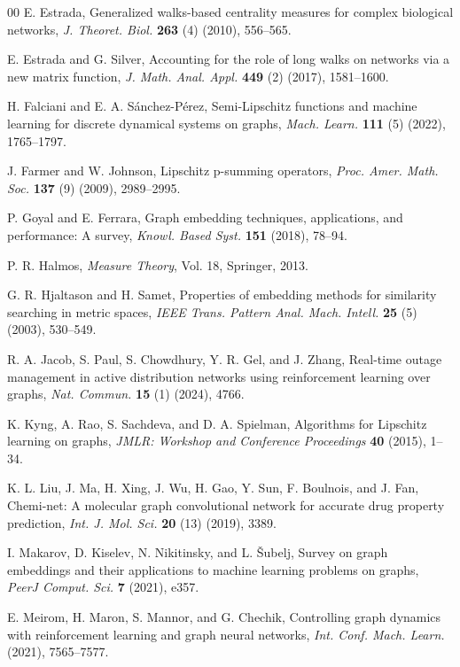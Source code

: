 \documentclass[preprint,12pt]{elsarticle}
\begin{document}
\begin{thebibliography}{00}
 E. Estrada, Generalized walks-based centrality measures for complex biological networks, \textit{J. Theoret. Biol.} \textbf{263} (4) (2010), 556--565.

 E. Estrada and G. Silver, Accounting for the role of long walks on networks via a new matrix function, \textit{J. Math. Anal. Appl.} \textbf{449} (2) (2017), 1581--1600.

 H. Falciani and E. A. Sánchez-Pérez, Semi-Lipschitz functions and machine learning for discrete dynamical systems on graphs, \textit{Mach. Learn.} \textbf{111} (5) (2022), 1765--1797.

 J. Farmer and W. Johnson, Lipschitz p-summing operators, \textit{Proc. Amer. Math. Soc.} \textbf{137} (9) (2009), 2989--2995.

 P. Goyal and E. Ferrara, Graph embedding techniques, applications, and performance: A survey, \textit{Knowl. Based Syst.} \textbf{151} (2018), 78--94.

 P. R. Halmos, \textit{Measure Theory}, Vol. 18, Springer, 2013.

 G. R. Hjaltason and H. Samet, Properties of embedding methods for similarity searching in metric spaces, \textit{IEEE Trans. Pattern Anal. Mach. Intell.} \textbf{25} (5) (2003), 530--549.

 R. A. Jacob, S. Paul, S. Chowdhury, Y. R. Gel, and J. Zhang, Real-time outage management in active distribution networks using reinforcement learning over graphs, \textit{Nat. Commun.} \textbf{15} (1) (2024), 4766.

 K. Kyng, A. Rao, S. Sachdeva, and D. A. Spielman, Algorithms for Lipschitz learning on graphs, \textit{JMLR: Workshop and Conference Proceedings} \textbf{40} (2015), 1--34.

 K. L. Liu, J. Ma, H. Xing, J. Wu, H. Gao, Y. Sun, F. Boulnois, and J. Fan, Chemi-net: A molecular graph convolutional network for accurate drug property prediction, \textit{Int. J. Mol. Sci.} \textbf{20} (13) (2019), 3389.

 I. Makarov, D. Kiselev, N. Nikitinsky, and L. Šubelj, Survey on graph embeddings and their applications to machine learning problems on graphs, \textit{PeerJ Comput. Sci.} \textbf{7} (2021), e357.

 E. Meirom, H. Maron, S. Mannor, and G. Chechik, Controlling graph dynamics with reinforcement learning and graph neural networks, \textit{Int. Conf. Mach. Learn.} (2021), 7565--7577.


\end{thebibliography}
\end{document}
